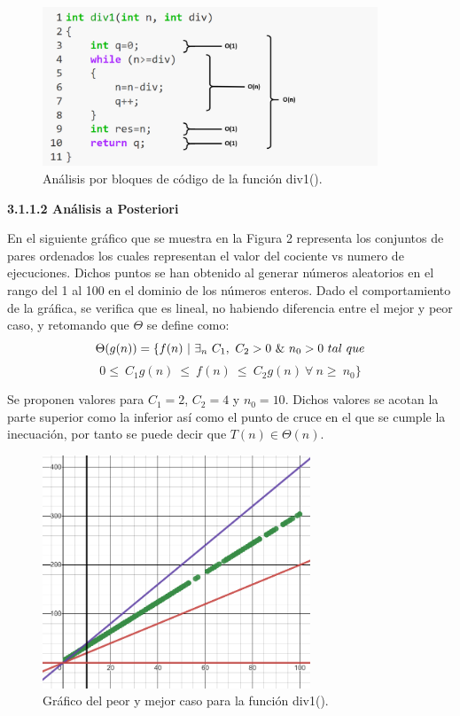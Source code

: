 \documentclass[12pt,twoside]{article}
\begin{document}
                \begin{figure}[H]
                    \centering
                    \includegraphics[width=10cm]{imagenes/divc1.png}
                    \caption{Análisis por bloques de código de la función div1().}
                \end{figure}
                
                
                {\bf 3.1.1.2 An\'alisis a Posteriori}
                
                En el siguiente gráfico que se muestra en la Figura 2 representa los conjuntos de pares ordenados los cuales representan el valor del cociente vs numero de ejecuciones. Dichos puntos se han obtenido al generar números aleatorios en el rango del 1 al 100 en el dominio de los números enteros.
                Dado el comportamiento de la gráfica, se verifica que es lineal, no habiendo diferencia entre el mejor y peor caso, y retomando que $\Theta$ se define como:
                $$\Theta(g(n)) = \{ f(n)~\arrowvert~\exists_{n}~C_{1},~C_{2}>0~\&~n_{0}>0~tal~que$$ $$0\leq~C_{1}g(n)~\leq~f(n)~\leq~C_{2}g(n)~\forall~n\geq~n_{0}\}$$
                
                
                Se proponen valores para $C_{1}=2$, $C_{2}=4$ y $n_{0}=10$. Dichos valores se acotan la parte superior como la inferior as\'i como el punto de cruce en el que se cumple la inecuación, por tanto se puede decir que $T(n)\in \Theta(n)$.

                
                \begin{figure}[H]
                    \centering
                    \includegraphics[width=8cm]{imagenes/div1.png}
                    \caption{Gráfico del peor y mejor caso para la función div1().}
                \end{figure}
                
\end{document}
